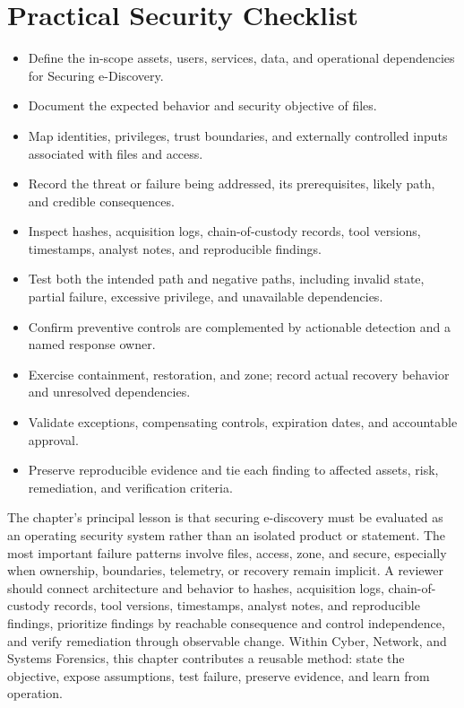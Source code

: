 \documentclass[11pt]{article}
\begin{document}
\section*{Practical Security Checklist}
\begin{itemize}[label=$\square$]
\item Define the in-scope assets, users, services, data, and operational dependencies for Securing e-Discovery.
\item Document the expected behavior and security objective of files.
\item Map identities, privileges, trust boundaries, and externally controlled inputs associated with files and access.
\item Record the threat or failure being addressed, its prerequisites, likely path, and credible consequences.
\item Inspect hashes, acquisition logs, chain-of-custody records, tool versions, timestamps, analyst notes, and reproducible findings.
\item Test both the intended path and negative paths, including invalid state, partial failure, excessive privilege, and unavailable dependencies.
\item Confirm preventive controls are complemented by actionable detection and a named response owner.
\item Exercise containment, restoration, and zone; record actual recovery behavior and unresolved dependencies.
\item Validate exceptions, compensating controls, expiration dates, and accountable approval.
\item Preserve reproducible evidence and tie each finding to affected assets, risk, remediation, and verification criteria.
\end{itemize}
\begin{synthesisbox}
The chapter's principal lesson is that securing e-discovery must be evaluated as an operating security system rather than an isolated product or statement. The most important failure patterns involve files, access, zone, and secure, especially when ownership, boundaries, telemetry, or recovery remain implicit. A reviewer should connect architecture and behavior to hashes, acquisition logs, chain-of-custody records, tool versions, timestamps, analyst notes, and reproducible findings, prioritize findings by reachable consequence and control independence, and verify remediation through observable change. Within Cyber, Network, and Systems Forensics, this chapter contributes a reusable method: state the objective, expose assumptions, test failure, preserve evidence, and learn from operation.
\end{synthesisbox}
\end{document}
